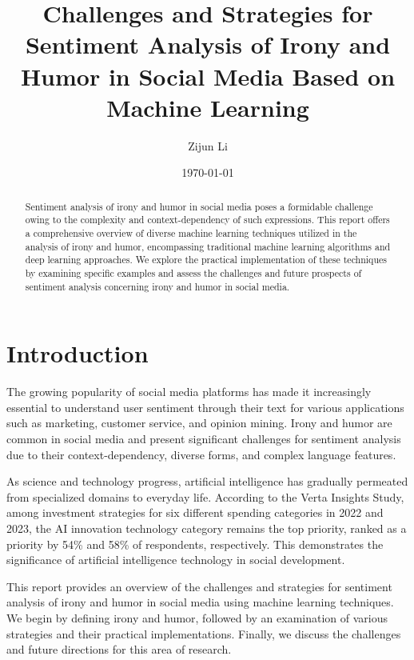 \documentclass[a4paper]{article}
\title{\textbf{Challenges and Strategies for Sentiment Analysis of Irony and Humor in Social Media Based on Machine Learning}}
\author{Zijun Li}
\date{\today}
\begin{document}
\setlength{\parindent}{2em}

\maketitle
\thispagestyle{empty}

\begin{abstract}
    Sentiment analysis of irony and humor in social media poses a formidable challenge owing to the complexity and context-dependency of such expressions. This report offers a comprehensive overview of diverse machine learning techniques utilized in the analysis of irony and humor, encompassing traditional machine learning algorithms and deep learning approaches. We explore the practical implementation of these techniques by examining specific examples and assess the challenges and future prospects of sentiment analysis concerning irony and humor in social media.
\end{abstract}

\newpage
\tableofcontents
\thispagestyle{empty}

\newpage
\setcounter{page}{1}
\section{Introduction}

The growing popularity of social media platforms has made it increasingly essential to understand user sentiment through their text for various applications such as marketing, customer service, and opinion mining. Irony and humor are common in social media and present significant challenges for sentiment analysis due to their context-dependency, diverse forms, and complex language features.

As science and technology progress, artificial intelligence has gradually permeated from specialized domains to everyday life. According to the Verta Insights Study, among investment strategies for six different spending categories in 2022 and 2023, the AI innovation technology category remains the top priority, ranked as a priority by 54\% and 58\% of respondents, respectively. This demonstrates the significance of artificial intelligence technology in social development.

This report provides an overview of the challenges and strategies for sentiment analysis of irony and humor in social media using machine learning techniques. We begin by defining irony and humor, followed by an examination of various strategies and their practical implementations. Finally, we discuss the challenges and future directions for this area of research.
\end{document}
